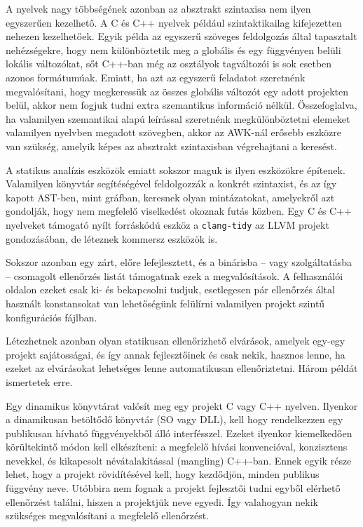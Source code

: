 A nyelvek nagy többségének azonban az absztrakt szintaxisa nem ilyen egyszerűen kezelhető. A C és C++ nyelvek például szintaktikailag kifejezetten nehezen kezelhetőek.
Egyik példa az egyszerű szöveges feldolgozás által tapasztalt nehézségekre, hogy nem különböztetik meg a globális és egy függvényen belüli lokális változókat, sőt C++-ban még az osztályok tagváltozói is sok esetben azonos formátumúak.
Emiatt, ha azt az egyszerű feladatot szeretnénk megvalósítani, hogy megkeressük az összes globális változót egy adott projekten belül, akkor nem fogjuk tudni extra szemantikus információ nélkül.
Összefoglalva, ha valamilyen szemantikai alapú leírással szeretnénk megkülönböztetni elemeket valamilyen nyelvben megadott szövegben, akkor az AWK-nál erősebb eszközre van szükség, amelyik képes az absztrakt szintaxisban végrehajtani a keresést.

A statikus analízis eszközök emiatt sokszor maguk is ilyen eszközökre építenek.
Valamilyen könyvtár segítéségével feldolgozzák a konkrét szintaxist, és az így kapott \gls{AST}-ben, mint gráfban, keresnek olyan mintázatokat, amelyekről azt gondolják, hogy nem megfelelő viselkedést okoznak futás közben.
Egy C és C++ nyelveket támogató nyílt forráskódú eszköz a {\tt clang-tidy} az LLVM projekt gondozásában, de léteznek kommersz eszközök is.

Sokszor azonban egy zárt, előre lefejlesztett, és a binárisba -- vagy szolgáltatásba -- csomagolt ellenőrzés listát támogatnak ezek a megvalósítások.
A felhasználói oldalon ezeket csak ki- és bekapcsolni tudjuk, esetlegesen pár ellenőrzés által használt konstansokat van lehetőségünk felülírni valamilyen projekt szintű konfigurációs fájlban.

Létezhetnek azonban olyan statikusan ellenőrizhető elvárások, amelyek egy-egy projekt sajátosságai, és így annak fejlesztőinek és csak nekik, hasznos lenne, ha ezeket az elvárásokat lehetséges lenne automatikusan ellenőriztetni.
Három példát ismertetek erre.

Egy dinamikus könyvtárat valósít meg egy projekt C vagy C++ nyelven.
Ilyenkor a dinamikusan betöltődő könyvtár (\gls{SO} vagy \gls{DLL}), kell hogy rendelkezzen egy publikusan hívható függvényekből álló interfésszel.
Ezeket ilyenkor kiemelkedően körültekintő módon kell elkészíteni: a megfelelő hívási konvencióval, konzisztens nevekkel, és kikapcsolt névátalakítással (mangling) C++-ban.
Ennek egyik része lehet, hogy a projekt rövidítésével kell, hogy kezdődjön, minden publikus függvény neve.
Utóbbira nem fognak a projekt fejlesztői tudni egyből elérhető ellenőrzést találni, hiszen a projektjük neve egyedi.
Így valahogyan nekik szükséges megvalósítani a megfelelő ellenőrzést.

